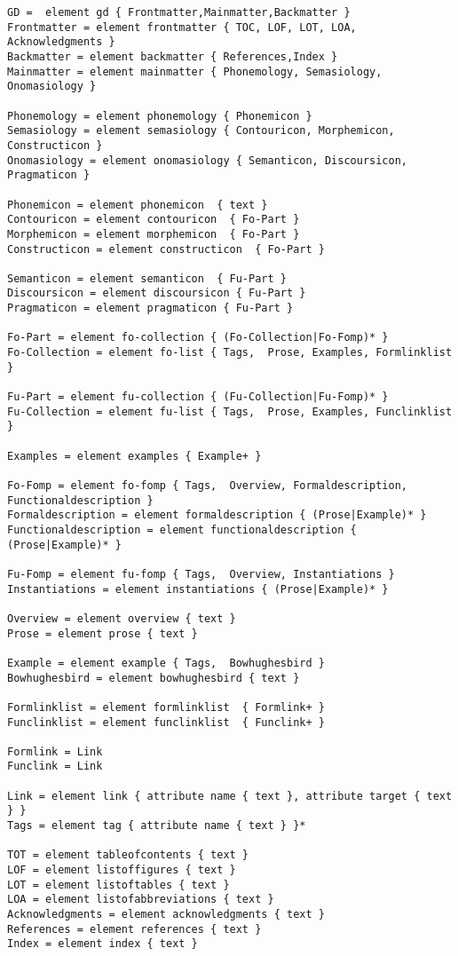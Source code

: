 \begin{verbatim}
GD =  element gd { Frontmatter,Mainmatter,Backmatter }
Frontmatter = element frontmatter { TOC, LOF, LOT, LOA, Acknowledgments }
Backmatter = element backmatter { References,Index }
Mainmatter = element mainmatter { Phonemology, Semasiology, Onomasiology }

Phonemology = element phonemology { Phonemicon }
Semasiology = element semasiology { Contouricon, Morphemicon, Constructicon }
Onomasiology = element onomasiology { Semanticon, Discoursicon, Pragmaticon }   

Phonemicon = element phonemicon  { text }
Contouricon = element contouricon  { Fo-Part }
Morphemicon = element morphemicon  { Fo-Part }
Constructicon = element constructicon  { Fo-Part }        

Semanticon = element semanticon  { Fu-Part } 
Discoursicon = element discoursicon { Fu-Part } 
Pragmaticon = element pragmaticon { Fu-Part }

Fo-Part = element fo-collection { (Fo-Collection|Fo-Fomp)* }
Fo-Collection = element fo-list { Tags,  Prose, Examples, Formlinklist }

Fu-Part = element fu-collection { (Fu-Collection|Fu-Fomp)* }
Fu-Collection = element fu-list { Tags,  Prose, Examples, Funclinklist }

Examples = element examples { Example+ }
 
Fo-Fomp = element fo-fomp { Tags,  Overview, Formaldescription, Functionaldescription }
Formaldescription = element formaldescription { (Prose|Example)* }
Functionaldescription = element functionaldescription { (Prose|Example)* }

Fu-Fomp = element fu-fomp { Tags,  Overview, Instantiations }
Instantiations = element instantiations { (Prose|Example)* }

Overview = element overview { text }
Prose = element prose { text }

Example = element example { Tags,  Bowhughesbird }
Bowhughesbird = element bowhughesbird { text }

Formlinklist = element formlinklist  { Formlink+ }
Funclinklist = element funclinklist  { Funclink+ }

Formlink = Link
Funclink = Link

Link = element link { attribute name { text }, attribute target { text } }
Tags = element tag { attribute name { text } }*

TOT = element tableofcontents { text }
LOF = element listoffigures { text }
LOT = element listoftables { text }
LOA = element listofabbreviations { text }
Acknowledgments = element acknowledgments { text }
References = element references { text }
Index = element index { text }

\end{verbatim}
\z
\normalsize

